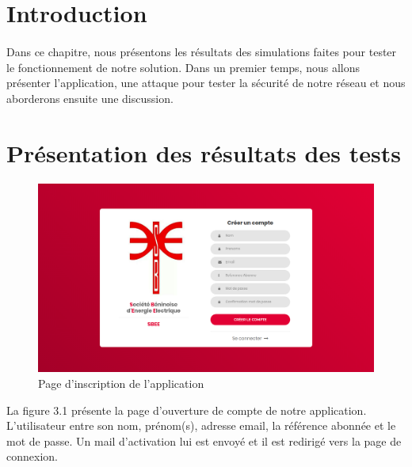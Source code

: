 \section*{Introduction}
    \paragraph{}
    Dans ce chapitre, nous présentons les résultats des simulations faites pour tester le fonctionnement de notre solution. Dans un premier temps,
    nous allons présenter l’application, une attaque pour tester la s\'ecurit\'e de notre r\'eseau et nous aborderons ensuite une discussion.


    \section{Présentation des résultats des tests}
      \paragraph{}
	  \begin{figure}[H]
	      \begin{center}
		  \includegraphics[scale=0.35]{images/register.png}
	      \end{center}
	      \caption{Page d'inscription de l'application}
	      \label{Accueil}
	  \end{figure}
	  La figure 3.1 présente la page d'ouverture de compte de notre application. L'utilisateur entre son nom, pr\'enom(s), adresse email, la r\'ef\'erence abonn\'ee et le mot de passe. Un mail d'activation lui est envoy\'e et il est redirig\'e vers la page de connexion.
	      
